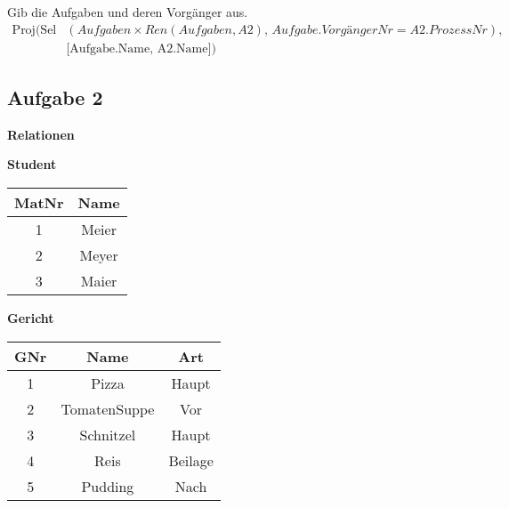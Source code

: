     Gib die Aufgaben und deren Vorgänger aus.
    \begin{align*}
        \text{Proj}\bigl(
        \text{Sel}&(Aufgaben \times Ren(Aufgaben, A2),\, Aufgabe.VorgängerNr = A2.ProzessNr),\, \\
        &\text{[Aufgabe.Name, A2.Name]}
        \bigr)
    \end{align*}


\subsection{Aufgabe 2}
\begin{table}[H]
    \scriptsize
    \centering
    \textbf{Relationen} \\ [10pt]
    \begin{minipage}[t]{0.2\textwidth}
        \centering
        \textbf{Student} \\[3pt]
        \begin{tabular}{|c|c|}
            \hline
            \textbf{MatNr} & \textbf{Name} \\
            \hline
            1 & Meier \\
            2 & Meyer \\
            3 & Maier \\
            \hline
        \end{tabular}
    \end{minipage}
    \hspace{0.2cm}
    \begin{minipage}[t]{0.3\textwidth}
        \centering
        \textbf{Gericht} \\ [3pt]
        \begin{tabular}{|c|c|c|}
            \hline
            \textbf{GNr} & \textbf{Name} & \textbf{Art} \\
            \hline
            1 & Pizza            & Haupt \\
            2 & TomatenSuppe     & Vor \\
            3 & Schnitzel        & Haupt \\
            4 & Reis             & Beilage \\
            5 & Pudding          & Nach \\
            \hline
        \end{tabular}
    \end{minipage}
    \hspace{0.2cm}
    \begin{minipage}[t]{0.3\textwidth}

\end{minipage}
\end{table}
